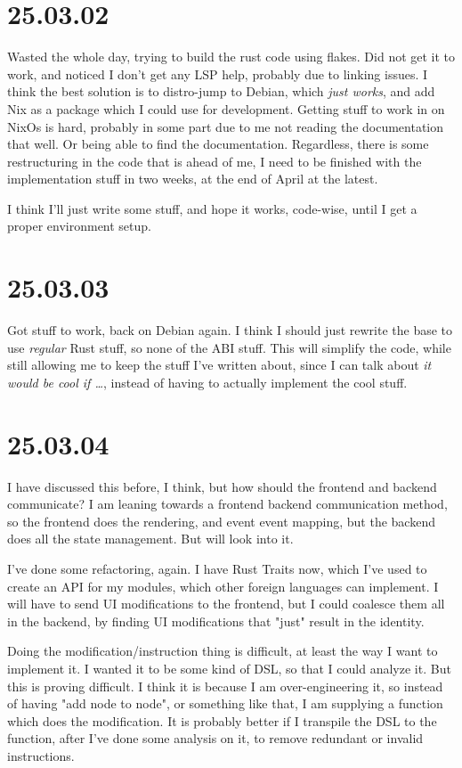 \section{25.03.02}

Wasted the whole day, trying to build the rust code using flakes. Did not get it
to work, and noticed I don't get any LSP help, probably due to linking issues. I
think the best solution is to distro-jump to Debian, which \textit{just works},
and add Nix as a package which I could use for development. Getting stuff to
work in on NixOs is hard, probably in some part due to me not reading the
documentation that well. Or being able to find the documentation.
Regardless, there is some restructuring in the code that is ahead of me, I need
to be finished with the implementation stuff in two weeks, at the end of April
at the latest.

I think I'll just write some stuff, and hope it works, code-wise, until I get a
proper environment setup.

\section{25.03.03}

Got stuff to work, back on Debian again. I think I should just rewrite the base
to use \textit{regular} Rust stuff, so none of the ABI stuff. This will simplify
the code, while still allowing me to keep the stuff I've written about, since I
can talk about \textit{it would be cool if \dots}, instead of having to actually
implement the cool stuff.

\section{25.03.04}

I have discussed this before, I think, but how should the frontend and backend
communicate? I am leaning towards a frontend \to backend communication method,
so the frontend does the rendering, and event \to event mapping, but the backend
does all the state management. But will look into it.

I've done some refactoring, again. I have Rust Traits now, which I've used to
create an API for my modules, which other foreign languages can implement. I
will have to send UI modifications to the frontend, but I could coalesce them
all in the backend, by finding UI modifications that "just" result in the
identity.

Doing the modification/instruction thing is difficult, at least the way I want
to implement it. I wanted it to be some kind of DSL, so that I could analyze it.
But this is proving difficult. I think it is because I am over-engineering it,
so instead of having "add node to node", or something like that, I am supplying
a function which does the modification. It is probably better if I transpile the
DSL to the function, after I've done some analysis on it, to remove redundant or
invalid instructions.
